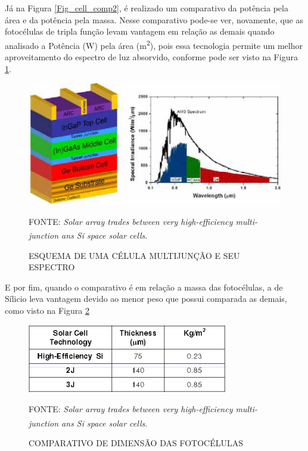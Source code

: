 \documentclass[
	12pt,				%
	openright,			%
	oneside,			%
	a4paper,			%
	english,			%
	french,				%
	spanish,			%
	brazil,				%
	oldfontcommands
	]{abntex2}
\begin{document}
	Já na Figura \ref{Fig_cell_comp2}, é realizado um comparativo da potência pela área e da potência pela massa. Nesse comparativo pode-se ver, novamente, que as fotocélulas de tripla função levam vantagem em relação as demais quando analisado a Potência (W) pela área (m\textsuperscript{2}), pois essa tecnologia permite um melhor aproveitamento do espectro de luz absorvido, conforme pode ser visto na Figura \ref{Fig_cell_mult}. 
	
	\begin{figure}[th]
		\caption{ESQUEMA DE UMA CÉLULA MULTIJUNÇÃO E SEU ESPECTRO}
		\label{Fig_cell_mult}
		\centering
		\includegraphics[width=1.05\linewidth]{./figs/cell_mult}
			
		\begin{small}
			FONTE: \textit{Solar array trades between very high-efficiency multi-junction ans Si space solar cells}.\textsuperscript{\cite{Fatemi}}
		\end{small}		
	\end{figure}
	\pagebreak
	
	E por fim, quando o comparativo é em relação a massa das fotocélulas, a de Sílicio leva vantagem devido ao menor peso que possui comparada as demais, como visto na Figura \ref{Fig_cell_comp3}
	
	\begin{figure}[th]
		\caption{COMPARATIVO DE DIMENSÃO DAS FOTOCÉLULAS}
		\label{Fig_cell_comp3}
		\centering
		\includegraphics[width=0.6\linewidth]{./figs/cell_comp3}
			
		\begin{small}
			FONTE: \textit{Solar array trades between very high-efficiency multi-junction ans Si space solar cells}.\textsuperscript{\cite{Fatemi}}
		\end{small}		
	\end{figure}
	
\end{document}
